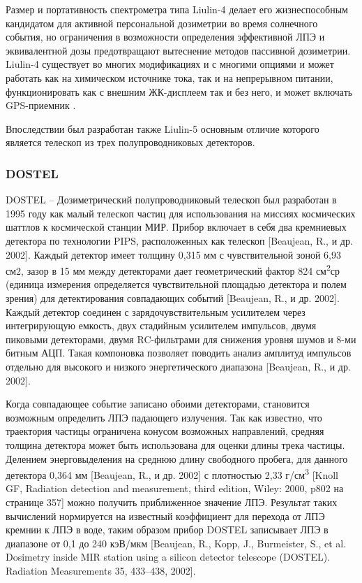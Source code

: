 Размер и портативность спектрометра типа Liulin-4 делает его жизнеспособным кандидатом для активной персональной дозиметрии во время солнечного события, но ограничения в возможности определения эффективной ЛПЭ и эквивалентной дозы предотвращают вытеснение методов пассивной дозиметрии. Liulin-4 существует во многих модификациях и с многими опциями и может работать как на химическом источнике тока, так и на непрерывном питании, функционировать как с внешним ЖК-дисплеем так и без него, и может включать GPS-приемник \cite{Dachev2002}.	

Впоследствии был разработан также Liulin-5 основным отличие которого является телескоп из трех полупроводниковых детекторов.

\subsubsection{DOSTEL}

DOSTEL -- Дозиметрический полупроводниковый телескоп был разработан в 1995 году как малый телескоп частиц для использования на миссиях космических шаттлов к космической станции МИР. Прибор включает в себя два кремниевых детектора по технологии PIPS, расположенных как телескоп [Beaujean, R., и др. 2002]. Каждый детектор имеет толщину 0,315 мм с чувствительной зоной 6,93 см2, зазор в 15 мм между детекторами дает геометрический фактор 824 см\textsuperscript{2}ср (единица измерения определяется чувствительной площадью детектора и полем зрения) для детектирования совпадающих событий [Beaujean, R., и др. 2002]. Каждый детектор соединен с зарядочувствительным усилителем через интегрирующую емкость, двух стадийным усилителем импульсов, двумя пиковыми детекторами, двумя RC-фильтрами для снижения уровня шумов и 8-ми битным АЦП. Такая компоновка позволяет поводить анализ амплитуд импульсов отдельно для высокого и низкого энергетического диапазона [Beaujean, R., и др. 2002].


Когда совпадающее событие записано обоими детекторами, становится возможным определить ЛПЭ падающего излучения. Так как известно, что траектория частицы ограничена конусом возможных направлений, средняя толщина детектора может быть использована для оценки длины трека частицы. Делением энерговыделения на среднюю длину свободного пробега, для данного детектора 0,364 мм [Beaujean, R., и др. 2002] с плотностью 2,33 г/см\textsuperscript{3} [Knoll GF, Radiation detection and measurement, third edition, Wiley: 2000, p802  на странице 357]  можно получить приближенное значение ЛПЭ. Результат таких вычислений нормируется на известный коэффициент для перехода от ЛПЭ кремнии к ЛПЭ в воде, таким образом прибор DOSTEL записывает ЛПЭ в диапазоне от 0,1 до 240 кэВ/мкм [Beaujean, R., Kopp, J., Burmeister, S., et al. Dosimetry inside MIR station using a silicon detector telescope (DOSTEL). Radiation Measurements 35, 433--438, 2002].


